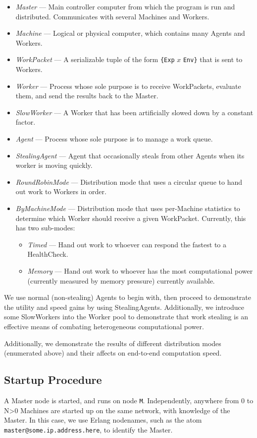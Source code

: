 \documentclass[letterpaper,twocolumn,10pt]{article}
\begin{document}
\begin{itemize}
    \item \textit{Master} --- Main controller computer from which the program
        is run and distributed. Communicates with several Machines and Workers.
    \item \textit{Machine} --- Logical or physical computer, which contains
        many Agents and Workers.
    \item \textit{WorkPacket} --- A serializable tuple of the form \verb|{Exp|
        $x$ \verb|Env}| that is sent to Workers.
    \item \textit{Worker} --- Process whose sole purpose is to receive
        WorkPackets, evaluate them, and send the results back to the Master.
    \item \textit{SlowWorker} --- A Worker that has been artificially slowed
        down by a constant factor.
    \item \textit{Agent} --- Process whose sole purpose is to manage a work
        queue.
    \item \textit{StealingAgent} --- Agent that occasionally steals from other
        Agents when its worker is moving quickly.
    \item \textit{RoundRobinMode} --- Distribution mode that uses a circular
        queue to hand out work to Workers in order.
    \item \textit{ByMachineMode} --- Distribution mode that uses per-Machine
        statistics to determine which Worker should receive a given WorkPacket.
        Currently, this has two sub-modes:
        \begin{itemize}
            \item \textit{Timed} --- Hand out work to whoever can respond the
                fastest to a HealthCheck.
            \item \textit{Memory} --- Hand out work to whoever has the most
                computational power (currently measured by memory pressure)
                currently available.
        \end{itemize}
\end{itemize}

We use normal (non-stealing) Agents to begin with, then proceed to demonstrate
the utility and speed gains by using StealingAgents. Additionally, we introduce
some SlowWorkers into the Worker pool to demonstrate that work stealing is an
effective means of combating heterogeneous computational power.

Additionally, we demonstrate the results of different distribution modes
(enumerated above) and their affects on end-to-end computation speed.

\subsection{Startup Procedure}

A Master node is started, and runs on node \verb|M|. Independently, anywhere
from 0 to N>0 Machines are started up on the same network, with knowledge of
the Master. In this case, we use Erlang nodenames, such as the atom
\verb|master@some.ip.address.here|, to identify the Master.
\end{document}
